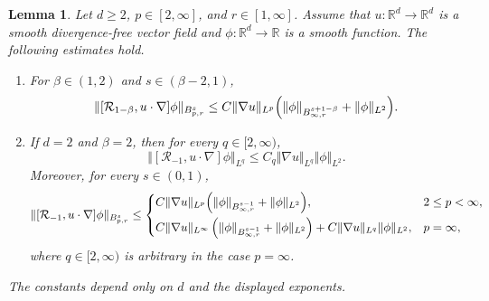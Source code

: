 \documentclass[reqno,11pt,a4paper]{amsart}
\newtheorem{lemma}[theorem]{Lemma}
\newcommand{\R}{\ensuremath{\mathbb{R}}}
\begin{document}
\begin{lemma}\label{lem:Rbeta-cm}
Let $d\geq2$, $p\in[2,\infty]$, and $r\in[1,\infty]$.
Assume that $u:\R^d\to\R^d$ is a smooth
divergence-free vector field and
$\phi:\R^d\to\R$ is a smooth function.
The following estimates hold.
\begin{enumerate}[(1)]
\item
For $\beta\in(1,2)$ and $s\in(\beta-2,1)$,
\begin{equation}\label{eq:Rbeta-cm-es}
  \Vert [\mathcal R_{1-\beta},u\cdot\nabla]\phi\Vert _{B^s_{p,r}}
  \leq
  C\Vert \nabla u\Vert _{L^p}
  \Bigl(
    \Vert \phi\Vert _{B^{s+1-\beta}_{\infty,r}}
    +\Vert \phi\Vert _{L^2}
  \Bigr).
\end{equation}

\item
If $d=2$ and $\beta=2$, then for every $q\in[2,\infty)$,
\begin{equation}\label{eq:comm-es1}
  \Vert [\mathcal R_{-1},u\cdot\nabla]\phi\Vert _{L^q}
  \leq
  C_q\Vert \nabla u\Vert _{L^q}\Vert \phi\Vert _{L^2}.
\end{equation}
Moreover, for every $s\in(0,1)$,
\begin{equation}\label{eq:R-1cm-es1}
\begin{aligned}
  \Vert [\mathcal R_{-1},u\cdot\nabla]\phi\Vert _{B^s_{p,r}}
  \leq
  \begin{cases}
    C\Vert \nabla u\Vert _{L^p}
    \Bigl(
      \Vert \phi\Vert _{B^{s-1}_{\infty,r}}
      +\Vert \phi\Vert _{L^2}
    \Bigr),
    & 2\leq p<\infty,
    \\[2mm]
    C\Vert \nabla u\Vert _{L^\infty}
    \left(\Vert \phi\Vert _{B^{s-1}_{\infty,r}}+\Vert \phi\Vert _{L^2}\right)
    +C\Vert \nabla u\Vert _{L^q}\Vert \phi\Vert _{L^2},
    & p=\infty,
  \end{cases}
\end{aligned}
\end{equation}
where $q\in[2,\infty)$ is arbitrary in the case $p=\infty$.
\end{enumerate}
The constants depend only on $d$ and the displayed exponents.
\end{lemma}
\end{document}
